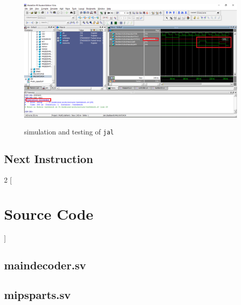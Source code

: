 \documentclass[titlepage,12pt,twoside,a4paper]{article}
\newcommand{\code}[1]{{\texttt{#1}}}
\begin{document}
\begin{figure}
	\includegraphics[width=\textwidth]{jaltest.png}
	\centering
	\label{jaltest}
	\caption{simulation and testing of \code{jal}}
\end{figure}


\subsection{Next Instruction}

\newpage
\appendix
\begin{multicols}{2}
[	
\section{Source Code}
\label{appendix:src}
]
\subsection{maindecoder.sv}


\subsection{mipsparts.sv}
\label{appendix:src:mipsparts}

\end{multicols}
\end{document}
